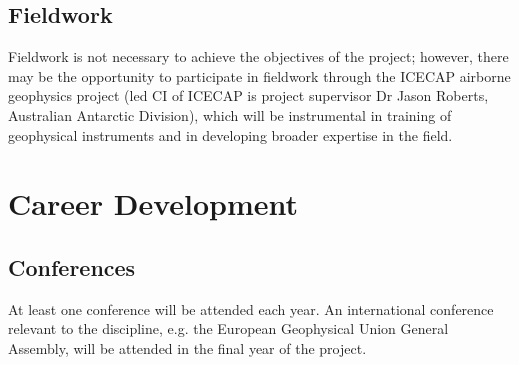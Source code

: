 \subsection*{Fieldwork}
Fieldwork is not necessary to achieve the objectives of the project; however, there may be the opportunity to participate in fieldwork through the ICECAP airborne geophysics project (led CI of ICECAP is project supervisor Dr Jason Roberts, Australian Antarctic Division), which will be instrumental in training of geophysical instruments and in developing broader expertise in the field.

\section*{Career Development}

\subsection*{Conferences}
At least one conference will be attended each year. An international conference relevant to the discipline, e.g. the European Geophysical Union General Assembly, will be attended in the final year of the project.
